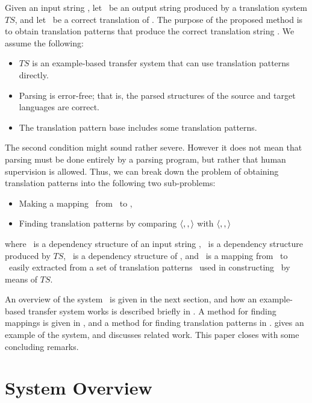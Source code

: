 Given an input string \Ss, let \St\ be an output string produced by a
translation system $TS$, and let \Sc\ be a correct translation of \Ss. The
purpose of the proposed method is to obtain translation patterns that produce
the correct translation string \Sc. We assume the following:
\begin{itemize}
\item $TS$ is an example-based transfer system that can use 
translation patterns directly.
\item Parsing is error-free; that is, the parsed structures
of the source and target languages are correct.
\item The translation pattern base includes some translation patterns.
\end{itemize}
The second condition might sound rather severe. However it does not mean that parsing
must be done entirely by a parsing program, but rather that human
supervision is allowed.  Thus, we can break down the problem of obtaining
translation patterns into the following two sub-problems:
\begin{itemize}
\item Making a mapping \Mc\ from \Ds\ to \Dc, 
\item Finding translation patterns by comparing
$\langle,,\rangle$ with $\langle,,\rangle$
\end{itemize}
where \Ds\ is a dependency structure of an input string \Ss, \Dt\ is a
dependency structure produced by $TS$, \Dc\ is a dependency structure of
\Sc, and \Mt\ is a mapping from \Ds\ to \Dt\ easily extracted from a set of
translation patterns \Tp\ used in constructing \Dt\ by means of $TS$.

An overview of the system \TranPet\ is given in the next section, and how an
example-based transfer system works is described briefly in
.  A method for finding mappings is given in
, and a method for finding translation patterns in
.
 gives an example of the system, and 
discusses related work. This paper closes with some concluding remarks.

\section{System Overview}
\label{sec:overview} 

